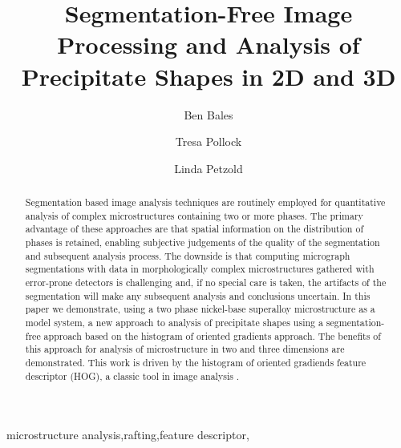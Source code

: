 \documentclass[review]{elsarticle}
\date{}
\begin{document}
	\begin{frontmatter}
		\title{Segmentation-Free Image Processing and Analysis of Precipitate Shapes in 2D and 3D}

		\author[mech]{Ben Bales}
		\author[mat]{Tresa Pollock}
		\author[mech]{Linda Petzold}
		
		\address[mech]{University of California, Department of Mechanical Engineering, Santa Barbara, CA 93106-5070}
		\address[mat]{Materials Department, Engineering II Building, 1355 University of California, Santa Barbara, Santa Barbara, CA 93106-5050}

		\begin{abstract}
		Segmentation based image analysis techniques are routinely employed for quantitative analysis of complex microstructures containing two or more phases.  The primary advantage of these approaches are that spatial information on the distribution of phases is retained, enabling subjective judgements of the quality of the segmentation and subsequent analysis process. The downside is that computing micrograph segmentations with data in morphologically complex microstructures gathered with error-prone detectors is challenging and, if no special care is taken, the artifacts of the segmentation will make any subsequent analysis and conclusions uncertain. In this paper we demonstrate, using a two phase nickel-base superalloy microstructure as a model system, a new approach to analysis of precipitate shapes using a segmentation-free approach based on the histogram of oriented gradients approach.  The benefits of this approach for analysis of microstructure in two and three dimensions are demonstrated. This work is driven by the histogram of oriented gradiends feature descriptor (HOG), a classic tool in image analysis \cite{gradtex, hog, girsh}.
		\end{abstract}

		\begin{keyword}
			microstructure analysis\sep rafting\sep feature descriptor\sep 
		\end{keyword}
	\end{frontmatter}
\end{document}
